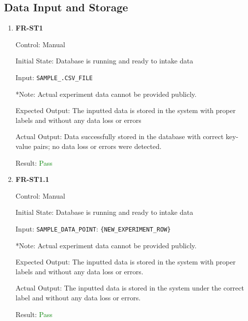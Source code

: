 \documentclass[12pt, titlepage]{article}
\begin{document}
\subsection{Data Input and Storage}
\begin{enumerate}
  \item{\textbf{FR-ST1}} \label{FR:ST1}

Control: Manual

Initial State: Database is running and ready to intake data

Input: \texttt{SAMPLE\_.CSV\_FILE}

\begin{footnotesize}
  *Note: Actual experiment data cannot be provided publicly.
\end{footnotesize}

Expected Output: The inputted data is stored in the system with proper labels
and without any data loss or errors

Actual Output: Data successfully stored in the database with correct key-value
pairs; no data loss or errors were detected.

Result: \textcolor{green}{Pass}

\item{\textbf{FR-ST1.1}} \label{FR:ST1.1}

Control: Manual

Initial State: Database is running and ready to intake data

Input: \texttt{SAMPLE\_DATA\_POINT}: \texttt{\{NEW\_EXPERIMENT\_ROW\}}

\begin{footnotesize}
  *Note: Actual experiment data cannot be provided publicly.
\end{footnotesize}

Expected Output: The inputted data is stored in the system with proper labels
and without any data loss or errors.

Actual Output: The inputted data is stored in the system under the correct label
and without any data loss or errors.

Result: \textcolor{green}{Pass}
\end{enumerate}
\end{document}
